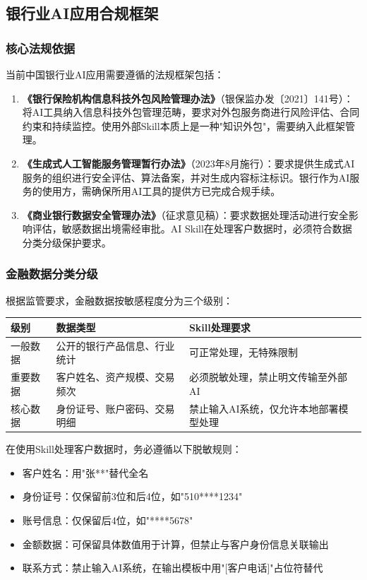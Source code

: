 \subsection{银行业AI应用合规框架}

\subsubsection{核心法规依据}

当前中国银行业AI应用需要遵循的法规框架包括：

\begin{enumerate}[leftmargin=2em]
  \item \textbf{《银行保险机构信息科技外包风险管理办法》}（银保监办发〔2021〕141号）：将AI工具纳入信息科技外包管理范畴，要求对外包服务商进行风险评估、合同约束和持续监控。使用外部Skill本质上是一种"知识外包"，需要纳入此框架管理。
  \item \textbf{《生成式人工智能服务管理暂行办法》}（2023年8月施行）：要求提供生成式AI服务的组织进行安全评估、算法备案，并对生成内容标注标识。银行作为AI服务的使用方，需确保所用AI工具的提供方已完成合规手续。
  \item \textbf{《商业银行数据安全管理办法》}（征求意见稿）：要求数据处理活动进行安全影响评估，敏感数据出境需经审批。AI Skill在处理客户数据时，必须符合数据分类分级保护要求。
\end{enumerate}

\subsubsection{金融数据分类分级}

根据监管要求，金融数据按敏感程度分为三个级别：

\begin{table}[H]
\centering
\begin{tabular}{lp{4cm}p{6cm}}
\toprule
\textbf{级别} & \textbf{数据类型} & \textbf{Skill处理要求} \\
\midrule
一般数据 & 公开的银行产品信息、行业统计 & 可正常处理，无特殊限制 \\
重要数据 & 客户姓名、资产规模、交易频次 & 必须脱敏处理，禁止明文传输至外部AI \\
核心数据 & 身份证号、账户密码、交易明细 & 禁止输入AI系统，仅允许本地部署模型处理 \\
\bottomrule
\end{tabular}
\end{table}

\begin{warningbox}[数据脱敏实操要点]
在使用Skill处理客户数据时，务必遵循以下脱敏规则：
\begin{itemize}[leftmargin=1em]
  \item 客户姓名：用"张**"替代全名
  \item 身份证号：仅保留前3位和后4位，如"510****1234"
  \item 账号信息：仅保留后4位，如"****5678"
  \item 金额数据：可保留具体数值用于计算，但禁止与客户身份信息关联输出
  \item 联系方式：禁止输入AI系统，在输出模板中用"[客户电话]"占位符替代
\end{itemize}
\end{warningbox}

